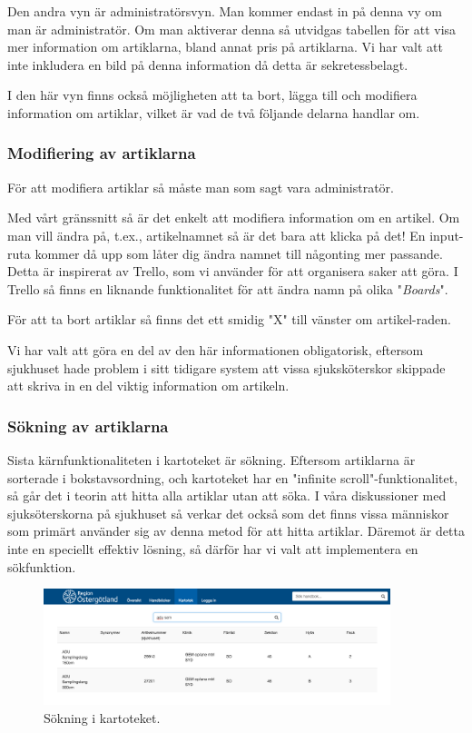 Den andra vyn är administratörsvyn.
Man kommer endast in på denna vy om man är administratör.
Om man aktiverar denna så utvidgas tabellen för att
visa mer information om artiklarna, bland annat pris på artiklarna.
Vi har valt att inte inkludera en bild på denna information
då detta är sekretessbelagt.

I den här vyn finns också möjligheten att ta bort, lägga till och modifiera
information om artiklar, vilket är vad de två följande delarna handlar om.

\clearpage
\subsubsection{Modifiering av artiklarna}
För att modifiera artiklar så måste man som sagt vara administratör.

Med vårt gränssnitt så är det enkelt att modifiera information om en artikel.
Om man vill ändra på, t.ex., artikelnamnet så är det bara att klicka på det!
En input-ruta kommer då upp som låter dig ändra namnet till någonting mer passande.
Detta är inspirerat av Trello, som vi använder för att organisera saker att göra.
I Trello så finns en liknande funktionalitet för att ändra namn på olika "\textit{Boards}".

För att ta bort artiklar så finns det ett smidig "X" till vänster om artikel-raden.

Vi har valt att göra en del av den här informationen obligatorisk, eftersom
sjukhuset hade problem i sitt tidigare system att vissa sjuksköterskor skippade
att skriva in en del viktig information om artikeln.


\subsubsection{Sökning av artiklarna}
Sista kärnfunktionaliteten i kartoteket är sökning.
Eftersom artiklarna är sorterade i bokstavsordning,
och kartoteket har en "infinite scroll"-funktionalitet,
så går det i teorin att hitta alla artiklar utan att söka.
I våra diskussioner med sjuksöterskorna på sjukhuset så
verkar det också som det finns vissa människor som primärt använder
sig av denna metod för att hitta artiklar.
Däremot är detta inte en speciellt effektiv lösning, så därför
har vi valt att implementera en sökfunktion.

\begin{figure}[h!]
  \centering
  \includegraphics[width=0.9\textwidth]{images/site/kartsearch.png}
  \caption{Sökning i kartoteket.}
  \label{fig:kartsearch}
\end{figure}


